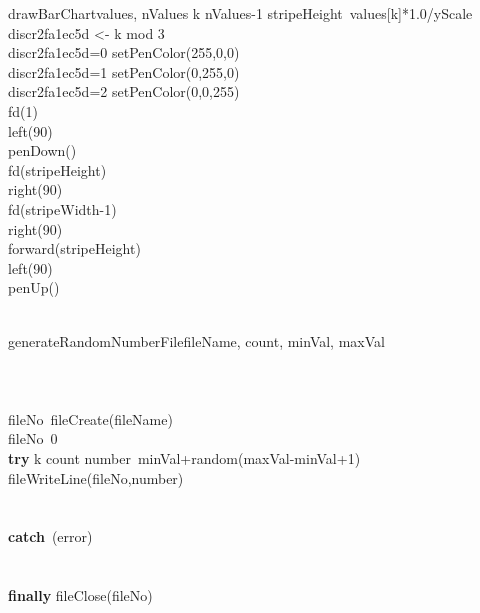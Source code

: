 \documentclass[a4paper,10pt]{article}
\begin{document}
\begin{pseudocode}{drawBarChart}{values, nValues }
  \FOR k  \TO nValues-1  \DO
  \BEGIN
    stripeHeight\gets\ values[k]*1.0/yScale\\
    discr2fa1ec5d <- k mod 3\\
    \IF discr2fa1ec5d=0 \THEN
      setPenColor(255,0,0)\\
    \ELSEIF discr2fa1ec5d=1 \THEN
      setPenColor(0,255,0)\\
    \ELSEIF discr2fa1ec5d=2 \THEN
      setPenColor(0,0,255)\\
    fd(1)\\
    left(90)\\
    penDown()\\
    fd(stripeHeight)\\
    right(90)\\
    fd(stripeWidth-1)\\
    right(90)\\
    forward(stripeHeight)\\
    left(90)\\
    penUp()\\
  \END\\
\ENDPROCEDURE
\end{pseudocode}


\begin{pseudocode}{generateRandomNumberFile}{fileName, count, minVal, maxVal }
\label{generateRandomNumberFile}
\\
\\
\\
\\
  fileNo\gets\ fileCreate(fileName)\\
  \IF fileNo\leq\ 0 \THEN
    \\
  \textbf{try} \BEGIN
    \FOR k  \TO count  \DO
    \BEGIN
      number\gets\ minVal+random(maxVal-minVal+1)\\
      fileWriteLine(fileNo,number)\\
    \END\\
  \END\\
  \textbf{catch}\ (error)\BEGIN
    \\
    \\
  \END\\
  \textbf{finally} \BEGIN
    fileClose(fileNo)\\
  \END\\
  \\
\ENDPROCEDURE
\end{pseudocode}
\end{document}
